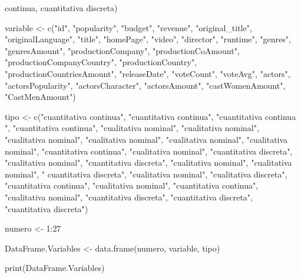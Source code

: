 \documentclass[
]{article}
\newenvironment{Shaded}{\begin{snugshade}}{\end{snugshade}}
\newcommand{\DecValTok}[1]{\textcolor[rgb]{0.00,0.00,0.81}{#1}}
\newcommand{\FunctionTok}[1]{\textcolor[rgb]{0.00,0.00,0.00}{#1}}
\newcommand{\NormalTok}[1]{#1}
\newcommand{\OtherTok}[1]{\textcolor[rgb]{0.56,0.35,0.01}{#1}}
\newcommand{\SpecialCharTok}[1]{\textcolor[rgb]{0.00,0.00,0.00}{#1}}
\newcommand{\StringTok}[1]{\textcolor[rgb]{0.31,0.60,0.02}{#1}}
\begin{document}
continua, cuantitativa discreta)

\begin{Shaded}
\begin{Highlighting}[]
\NormalTok{variable }\OtherTok{\textless{}{-}} \FunctionTok{c}\NormalTok{(}\StringTok{"id"}\NormalTok{, }\StringTok{"popularity"}\NormalTok{, }\StringTok{"budget"}\NormalTok{, }\StringTok{"revenue"}\NormalTok{, }\StringTok{"original\_title"}\NormalTok{, }\StringTok{"originalLanguage"}\NormalTok{, }\StringTok{"title"}\NormalTok{, }\StringTok{"homePage"}\NormalTok{, }\StringTok{"video"}\NormalTok{, }\StringTok{"director"}\NormalTok{, }\StringTok{"runtime"}\NormalTok{, }\StringTok{"genres"}\NormalTok{, }\StringTok{"genresAmount"}\NormalTok{, }\StringTok{"productionCompany"}\NormalTok{, }\StringTok{"productionCoAmount"}\NormalTok{, }\StringTok{"productionCompanyCountry"}\NormalTok{, }\StringTok{"productionCountry"}\NormalTok{, }\StringTok{"productionCountriesAmount"}\NormalTok{, }\StringTok{"releaseDate"}\NormalTok{, }\StringTok{"voteCount"}\NormalTok{, }\StringTok{"voteAvg"}\NormalTok{, }\StringTok{"actors"}\NormalTok{, }\StringTok{"actorsPopularity"}\NormalTok{, }\StringTok{"actorsCharacter"}\NormalTok{, }\StringTok{"actorsAmount"}\NormalTok{, }\StringTok{"castWomenAmount"}\NormalTok{, }\StringTok{"CastMenAmount"}\NormalTok{)}

\NormalTok{tipo }\OtherTok{\textless{}{-}} \FunctionTok{c}\NormalTok{(}\StringTok{"cuantitativa continua"}\NormalTok{, }\StringTok{"cuantitativa continua"}\NormalTok{, }\StringTok{"cuantitativa continua "}\NormalTok{, }\StringTok{"cuantitativa continua"}\NormalTok{, }\StringTok{"cualitativa nominal"}\NormalTok{, }\StringTok{"cualitativa nominal"}\NormalTok{, }\StringTok{"cualitativa nominal"}\NormalTok{, }\StringTok{"cualitativa nominal"}\NormalTok{, }\StringTok{"cualitativa nominal"}\NormalTok{, }\StringTok{"cualitativa nominal"}\NormalTok{, }\StringTok{"cuantitativa continua"}\NormalTok{, }\StringTok{"cualitativa nominal"}\NormalTok{, }\StringTok{"cuantitativa discreta"}\NormalTok{, }\StringTok{"cualitativa nominal"}\NormalTok{, }\StringTok{"cuantitativa discreta"}\NormalTok{, }\StringTok{"cualitativa nominal"}\NormalTok{, }\StringTok{"cualitativa nominal"}\NormalTok{, }\StringTok{" cuantitativa discreta"}\NormalTok{, }\StringTok{"cualitativa nominal"}\NormalTok{, }\StringTok{"cualitativa discreta"}\NormalTok{, }\StringTok{"cuantitativa continua"}\NormalTok{, }\StringTok{"cualitativa nominal"}\NormalTok{, }\StringTok{"cuantitativa continua"}\NormalTok{, }\StringTok{"cualitativa nominal"}\NormalTok{, }\StringTok{"cuantitativa discreta"}\NormalTok{, }\StringTok{"cuantitativa discreta"}\NormalTok{, }\StringTok{"cuantitativa discreta"}\NormalTok{)}

\NormalTok{numero }\OtherTok{\textless{}{-}} \DecValTok{1}\SpecialCharTok{:}\DecValTok{27}

\NormalTok{DataFrame.Variables }\OtherTok{\textless{}{-}} \FunctionTok{data.frame}\NormalTok{(numero, variable, tipo)}

\FunctionTok{print}\NormalTok{(DataFrame.Variables)}
\end{Highlighting}
\end{Shaded}
\end{document}

